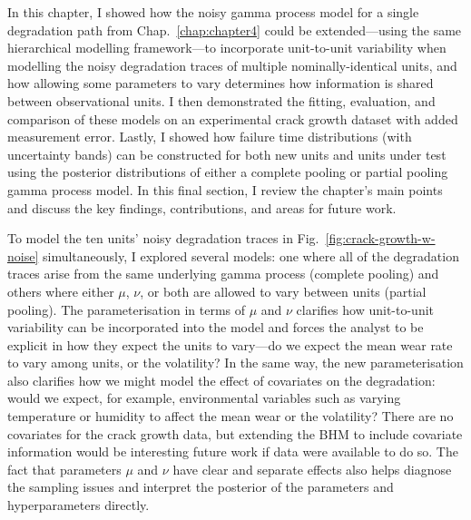 In this chapter, I showed how the noisy gamma process model for a single degradation path from Chap.~\ref{chap:chapter4} could be extended---using the same hierarchical modelling framework---to incorporate unit-to-unit variability when modelling the noisy degradation traces of multiple nominally-identical units, and how allowing some parameters to vary determines how information is shared between observational units. I then demonstrated the fitting, evaluation, and comparison of these models on an experimental crack growth dataset with added measurement error. Lastly, I showed how failure time distributions (with uncertainty bands) can be constructed for both new units and units under test using the posterior distributions of either a complete pooling or partial pooling gamma process model. In this final section, I review the chapter's main points and discuss the key findings, contributions, and areas for future work.

To model the ten units' noisy degradation traces in Fig.~\ref{fig:crack-growth-w-noise} simultaneously, I explored several models: one where all of the degradation traces arise from the same underlying gamma process (complete pooling) and others where either $\mu$, $\nu$, or both are allowed to vary between units (partial pooling). The parameterisation in terms of $\mu$ and $\nu$ clarifies how unit-to-unit variability can be incorporated into the model and forces the analyst to be explicit in how they expect the units to vary---do we expect the mean wear rate to vary among units, or the volatility? In the same way, the new parameterisation also clarifies how we might model the effect of covariates on the degradation: would we expect, for example, environmental variables such as varying temperature or humidity to affect the mean wear or the volatility? There are no covariates for the crack growth data, but extending the BHM to include covariate information would be interesting future work if data were available to do so. The fact that parameters $\mu$ and $\nu$ have clear and separate effects also helps diagnose the sampling issues and interpret the posterior of the parameters and hyperparameters directly.

